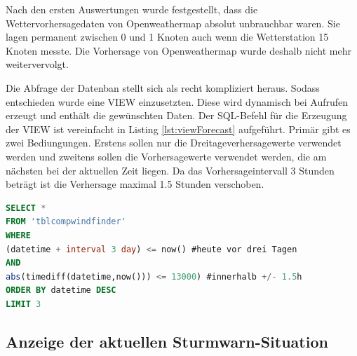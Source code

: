Nach den ersten Auswertungen wurde festgestellt, dass die Wettervorhersagedaten von Openweathermap absolut unbrauchbar waren. Sie lagen permanent zwischen 0 und 1 Knoten auch wenn die Wetterstation 15 Knoten messte. Die Vorhersage von Openweathermap wurde deshalb nicht mehr weitervervolgt.

Die Abfrage der Datenban stellt sich als recht kompliziert heraus. Sodass entschieden wurde eine VIEW einzusetzten. Diese wird dynamisch bei Aufrufen erzeugt und enthält die gewünschten Daten. Der SQL-Befehl für die Erzeugung der VIEW ist vereinfacht in Listing \ref{lst:viewForecast} aufgeführt. Primär gibt es zwei Bediungungen. Erstens sollen nur die Dreitageverhersagewerte verwendet werden und zweitens sollen die Vorhersagewerte verwendet werden, die am nächsten bei der aktuellen Zeit liegen. Da das Vorhersageintervall 3 Stunden beträgt ist die Verhersage maximal 1.5 Stunden verschoben.

\begin{lstlisting}[label=lst:viewForecast,caption=Erzeugung der VIEW für den Forecast-Vergleich, language=SQL, style=htmlcssjs]
SELECT *
FROM 'tblcompwindfinder'
WHERE
(datetime + interval 3 day) <= now() #heute vor drei Tagen
AND
abs(timediff(datetime,now())) <= 13000) #innerhalb +/- 1.5h
ORDER BY datetime DESC
LIMIT 3
\end{lstlisting}



\subsection{Anzeige der aktuellen Sturmwarn-Situation}
\label{subsec:sturmwarnung}


